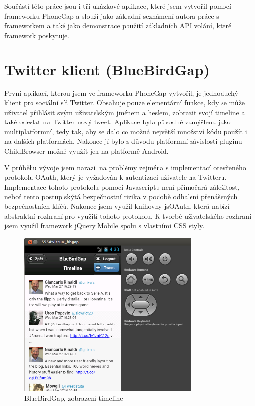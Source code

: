 Součástí této práce jsou i tři ukázkové aplikace, které jsem vytvořil pomocí frameworku PhoneGap a slouží jako základní seznámení autora práce s frameworkem a také jako demonstrace použití základních API volání, které framework poskytuje.

\section{Twitter klient (BlueBirdGap)}
První aplikací, kterou jsem ve frameworku PhoneGap vytvořil, je jednoduchý klient pro sociální síť Twitter. Obsahuje pouze elementární funkce, kdy se může uživatel přihlásit svým uživatelským jménem a heslem, zobrazit svojí timeline a také odeslat na Twitter nový tweet. Aplikace byla původně zamýšlena jako multiplatformní, tedy tak, aby se dalo co možná největší množství kódu použít i na dalších platformách. Nakonec jí bylo z důvodu platformní závislosti pluginu ChildBrowser možné využít jen na platformě Android.

V průběhu vývoje jsem narazil na problémy zejména s implementací otevřeného protokolu OAuth, který je vyžadován k autentizaci uživatele na Twitteru. Implementace tohoto protokolu pomocí Javascriptu není přímočará záležitost, neboť tento postup skýtá bezpečnostní rizika v podobě odhalení přenášených bezpečnostních klíčů. Nakonec jsem využil knihovny jsOAuth, která nabízí abstraktní rozhraní pro využití tohoto protokolu. K tvorbě uživatelského rozhraní jsem využil framework jQuery Mobile spolu s vlastními CSS styly.

\begin{figure}[H]\centering
\includegraphics[width=0.8\textwidth]{bbgap_timeline.png}
\caption{BlueBirdGap, zobrazení timeline}
\label{fig:BbGapTimeline}
\end{figure}

